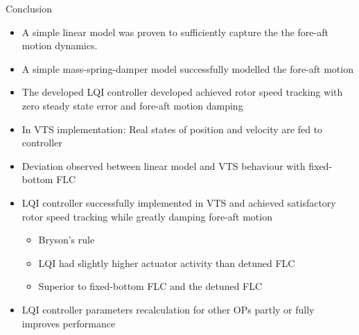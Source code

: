 \begin{frame}{Conclusion}{}
	\begin{itemize}
		\item A simple linear model was proven to sufficiently capture the the fore-aft motion dynamics.
		\item A simple mass-spring-damper model successfully modelled the fore-aft motion
		\item The developed LQI controller developed achieved rotor speed tracking with zero steady state error and fore-aft motion damping
		\item In VTS implementation: Real states of position and velocity are fed to controller
		\item Deviation observed between linear model and VTS behaviour with fixed-bottom FLC
		\item LQI controller successfully implemented in VTS and achieved satisfactory rotor speed tracking while greatly damping fore-aft motion
		\begin{itemize}
			\item Bryson's rule
			\item LQI had slightly higher actuator activity than detuned FLC
			\item Superior to fixed-bottom FLC and the detuned FLC
		\end{itemize}
	\item LQI controller parameters recalculation for other OPs partly or fully improves performance
	\end{itemize}
\end{frame}
